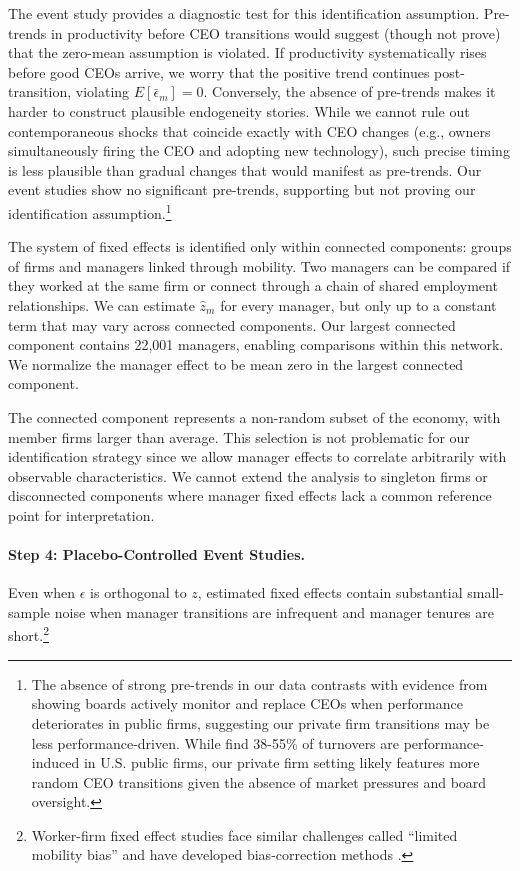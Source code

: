 \documentclass[11pt,a4paper]{article}
\begin{document}
The event study provides a diagnostic test for this identification assumption. Pre-trends in productivity before CEO transitions would suggest (though not prove) that the zero-mean assumption is violated. If productivity systematically rises before good CEOs arrive, we worry that the positive trend continues post-transition, violating $E[\bar{\epsilon}_m] = 0$. Conversely, the absence of pre-trends makes it harder to construct plausible endogeneity stories. While we cannot rule out contemporaneous shocks that coincide exactly with CEO changes (e.g., owners simultaneously firing the CEO and adopting new technology), such precise timing is less plausible than gradual changes that would manifest as pre-trends. Our event studies show no significant pre-trends, supporting but not proving our identification assumption.\footnote{The absence of strong pre-trends in our data contrasts with evidence from \citet{cornelli2013monitoring} showing boards actively monitor and replace CEOs when performance deteriorates in public firms, suggesting our private firm transitions may be less performance-driven. While \citet{jenter2021performance} find 38-55\% of turnovers are performance-induced in U.S. public firms, our private firm setting likely features more random CEO transitions given the absence of market pressures and board oversight.}

The system of fixed effects is identified only within connected components: groups of firms and managers linked through mobility. Two managers can be compared if they worked at the same firm or connect through a chain of shared employment relationships. We can estimate $\hat z_m$ for every manager, but only up to a constant term that may vary across connected components. Our largest connected component contains 22,001 managers, enabling comparisons within this network. We normalize the manager effect to be mean zero in the largest connected component.

The connected component represents a non-random subset of the economy, with member firms larger than average. This selection is not problematic for our identification strategy since we allow manager effects to correlate arbitrarily with observable characteristics. We cannot extend the analysis to singleton firms or disconnected components where manager fixed effects lack a common reference point for interpretation.

\paragraph{Step 4: Placebo-Controlled Event Studies.} Even when $\epsilon$ is orthogonal to $z$, estimated fixed effects contain substantial small-sample noise when manager transitions are infrequent and manager tenures are short.\footnote{Worker-firm fixed effect studies face similar challenges called ``limited mobility bias'' \citep{andrews2008high} and have developed bias-correction methods \citep{Bonhomme2023-dx, gaure2014correlation}.}
\end{document}
